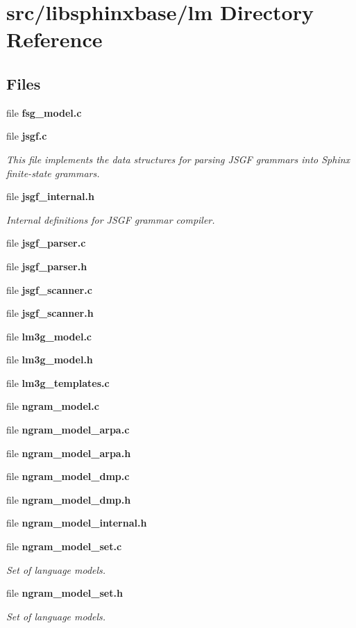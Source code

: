 \section{src/libsphinxbase/lm Directory Reference}
\label{dir_60aae0458aa1ecc8feb93296b73d98ea}
\subsection*{Files}
\begin{DoxyCompactItemize}
\item 
file {\bfseries fsg\+\_\+model.\+c}
\item 
file {\bf jsgf.\+c}
\begin{DoxyCompactList}\small\item\em This file implements the data structures for parsing J\+S\+G\+F grammars into Sphinx finite-\/state grammars. \end{DoxyCompactList}\item 
file {\bf jsgf\+\_\+internal.\+h}
\begin{DoxyCompactList}\small\item\em Internal definitions for J\+S\+G\+F grammar compiler. \end{DoxyCompactList}\item 
file {\bfseries jsgf\+\_\+parser.\+c}
\item 
file {\bfseries jsgf\+\_\+parser.\+h}
\item 
file {\bfseries jsgf\+\_\+scanner.\+c}
\item 
file {\bfseries jsgf\+\_\+scanner.\+h}
\item 
file {\bfseries lm3g\+\_\+model.\+c}
\item 
file {\bfseries lm3g\+\_\+model.\+h}
\item 
file {\bfseries lm3g\+\_\+templates.\+c}
\item 
file {\bfseries ngram\+\_\+model.\+c}
\item 
file {\bfseries ngram\+\_\+model\+\_\+arpa.\+c}
\item 
file {\bfseries ngram\+\_\+model\+\_\+arpa.\+h}
\item 
file {\bfseries ngram\+\_\+model\+\_\+dmp.\+c}
\item 
file {\bfseries ngram\+\_\+model\+\_\+dmp.\+h}
\item 
file {\bfseries ngram\+\_\+model\+\_\+internal.\+h}
\item 
file {\bf ngram\+\_\+model\+\_\+set.\+c}
\begin{DoxyCompactList}\small\item\em Set of language models. \end{DoxyCompactList}\item 
file {\bf ngram\+\_\+model\+\_\+set.\+h}
\begin{DoxyCompactList}\small\item\em Set of language models. \end{DoxyCompactList}\end{DoxyCompactItemize}
